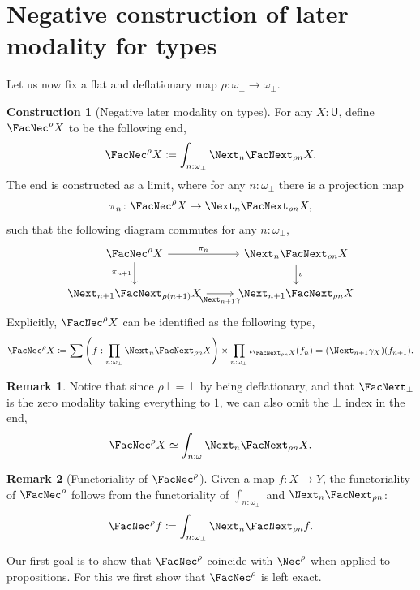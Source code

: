 \documentclass[a4paper,10pt]{amsart}
\theoremstyle{definition}
\newtheorem{remark}{Remark}[section]
\newtheorem{construction}{Construction}[section]
\newcommand{\ms}[1]{\mathsf{#1}}
\newcommand{\prth}[1]{\left(#1\right)}
\newcommand{\ovob}{\omega_\bot}
\newcommand{\bx}{\FacNec}
\newcommand{\bbx}{\Nec}
\newcommand{\Type}{\ms U}
\newcommand{\opm}[1]{\FacNext_{#1}}
\newcommand{\clm}[1]{\Next_{#1}}
\begin{document}
\section{Negative construction of later modality for types}

Let us now fix a flat and deflationary map $\rho \colon \ovob \to \ovob$.

\begin{construction}[Negative later modality on types]\label{negmodtype}
  For any $X\colon\Type$, define $\bx^\rho X$ to be the following end,
  \[ \bx^\rho X \coloneq \int_{n:\ovob} \clm n \opm{\rho n} X. \]
  The end is constructed as a limit, where for any $n:\ovob$ there is a projection map
  \[ \pi_n \colon \bx^\rho X \to \clm n \opm{\rho n}X, \]
  such that the following diagram commutes for any $n:\ovob$,
  \[
  \begin{tikzcd}
    \bx^\rho X \ar[r, "\pi_n"] \ar[d, "\pi_{n+1}"'] & \clm n \opm{\rho n}X \ar[d, "\iota"] \\ 
    \clm{n+1}\opm{\rho(n+1)}X \ar[r, "\clm{n+1}\gamma"'] & \clm{n+1}\opm{\rho n}X
  \end{tikzcd}
  \]
  Explicitly, $\bx^\rho X$ can be identified as the following type,
  \[ \bx^\rho X \coloneq \sum\prth{f : \prod_{n:\ovob} \clm n \opm{\rho n}X} \times \prod_{n:\ovob} \iota_{\opm{\rho n}X}(f_n) = (\clm{n+1}\gamma_{X})(f_{n+1}). \]
\end{construction}

\begin{remark}
  Notice that since $\rho\bot = \bot$ by being deflationary, and that $\opm\bot$ is the zero modality taking everything to $1$, we can also omit the $\bot$ index in the end,
  \[ \bx^\rho X \simeq \int_{n:\omega}\clm n\opm{\rho n}X. \]
\end{remark}

\begin{remark}[Functoriality of $\bx^\rho$]\label{funcofmodality}
  Given a map $f \colon X \to Y$, the functoriality of $\bx^\rho$ follows from the functoriality of $\int_{n:\ovob}$ and $\clm n\opm{\rho n}$:
  \[ \bx^\rho f \coloneq \int_{n:\ovob}\clm n\opm{\rho n}f. \]
\end{remark}

Our first goal is to show that $\bx^\rho$ coincide with $\bbx^\rho$ when applied to propositions. For this we first show that $\bx^\rho$ is left exact.
\end{document}
